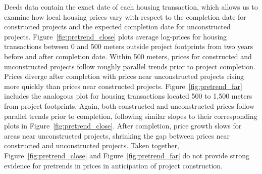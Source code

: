 \documentclass[12pt]{article}
\begin{document}
Deeds data contain the exact date of each housing transaction, which allows us to examine how local housing prices vary with respect to the completion date for constructed projects and the expected completion date for unconstructed projects.  Figure~\ref{fig:pretrend_close} plots average log-prices for housing transactions between 0 and 500 meters outside project footprints from two years before and after completion date.  Within 500 meters, prices for constructed and unconstructed projects follow roughly parallel trends prior to project completion.  Prices diverge after completion with prices near unconstructed projects rising more quickly than prices near constructed projects.  Figure~\ref{fig:pretrend_far} includes the analogous plot for housing transactions located 500 to 1,500 meters from project footprints.  Again, both constructed and unconstructed prices follow parallel trends prior to completion, following similar slopes to their corresponding plots in Figure~\ref{fig:pretrend_close}.  After completion, price growth slows for areas near unconstructed projects, shrinking the gap between prices near constructed and unconstructed projects.  Taken together, Figure~\ref{fig:pretrend_close} and Figure~\ref{fig:pretrend_far} do not provide strong evidence for pretrends in prices in anticipation of project construction.  


\end{document}
